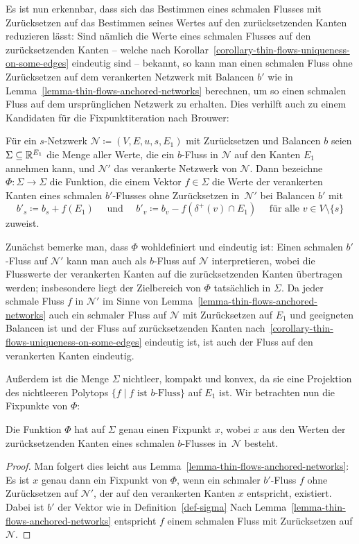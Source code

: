 Es ist nun erkennbar, dass sich das Bestimmen eines schmalen Flusses mit Zurück\-setzen auf das Bestimmen seines Wertes auf den zurücksetzenden Kanten reduzieren lässt:
Sind nämlich die Werte eines schmalen Flusses auf den zurücksetzenden Kanten -- welche nach Korollar~\ref{corollary-thin-flows-uniqueness-on-some-edges} eindeutig sind -- bekannt, so kann man einen schmalen Fluss ohne Zurücksetzen auf dem verankerten Netzwerk mit Balancen $b'$ wie in Lemma~\ref{lemma-thin-flows-anchored-networks} berechnen, um so einen schmalen Fluss auf dem ursprünglichen Netzwerk zu erhalten.
Dies verhilft auch zu einem Kandidaten für die Fixpunktiteration nach Brouwer:

\begin{definition}\label{def-sigma}
	Für ein $s$-Netzwerk $\mathcal{N} \coloneq (V, E, u, s, E_1)$ mit Zurücksetzen und Balancen $b$ seien $\Sigma\subseteq \mathbb{R}^{E_1}$ die Menge aller Werte, die ein $b$-Fluss in $\mathcal{N}$ auf den Kanten $E_1$ annehmen kann, und $\mathcal{N}'$ das verankerte Netzwerk von $\mathcal{N}$.
	Dann bezeichne $\Phi: \Sigma \rightarrow \Sigma$ die Funktion, die einem Vektor $f\in\Sigma$ die Werte der verankerten Kanten eines schmalen $b'$-Flusses ohne Zurücksetzen in~$\mathcal{N}'$ bei Balancen $b'$ mit
	\[
	b'_s \coloneq b_s + f(E_1) \text{~~~ und ~~~} b'_v \coloneq b_v - f( \delta^+(v)\cap E_1) \text{~~~ für alle $v\in V\setminus \{ s \}$}
	\]
	zuweist.
\end{definition}

Zunächst bemerke man, dass $\Phi$ wohldefiniert und eindeutig ist:
Einen schmalen $b'$-Fluss auf $\mathcal{N}'$ kann man auch als $b$-Fluss auf $\mathcal{N}$ interpretieren, wobei die Flusswerte der verankerten Kanten auf die zurücksetzenden Kanten übertragen werden; insbesondere liegt der Zielbereich von $\Phi$ tatsächlich in $\Sigma$.
Da jeder schmale Fluss $f$ in $\mathcal{N}'$ im Sinne von Lemma~\ref{lemma-thin-flows-anchored-networks} auch ein schmaler Fluss auf $\mathcal{N}$ mit Zurücksetzen auf $E_1$ und geeigneten Balancen ist und der Fluss auf zurücksetzenden Kanten nach~\ref{corollary-thin-flows-uniqueness-on-some-edges} eindeutig ist, ist auch der Fluss auf den verankerten Kanten eindeutig.

Außerdem ist die Menge $\Sigma$ nichtleer, kompakt und konvex, da sie eine Projek\-tion des nichtleeren Polytops $\{ f \mid \text{$f$ ist $b$-Fluss} \}$ auf $E_1$ ist.
Wir betrachten nun die Fixpunkte von $\Phi$:
\begin{proposition}
	Die Funktion $\Phi$ hat auf $\Sigma$ genau einen Fixpunkt $x$, wobei $x$ aus den Werten der zurücksetzenden Kanten eines schmalen $b$-Flusses in~$\mathcal{N}$ besteht.
\end{proposition}
\begin{proof}
	Man folgert dies leicht aus Lemma~\ref{lemma-thin-flows-anchored-networks}:
	Es ist $x$ genau dann ein Fixpunkt von $\Phi$, wenn ein schmaler $b'$-Fluss $f$ ohne Zurücksetzen auf $\mathcal{N}'$, der auf den verankerten Kanten $x$ entspricht, existiert.
	Dabei ist $b'$ der Vektor wie in Definition~\ref{def-sigma}
	Nach Lemma~\ref{lemma-thin-flows-anchored-networks} entspricht $f$ einem schmalen Fluss mit Zurücksetzen auf $\mathcal{N}$.
\end{proof}

